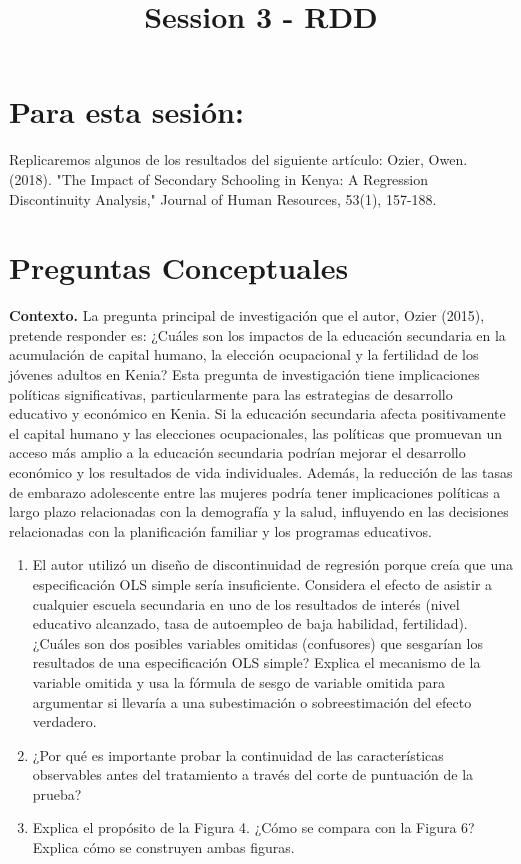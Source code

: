 \documentclass[11pt,a4paper,english]{article}
\title{Session 3 - RDD}
\author{}
\date{}
\begin{document}
\maketitle

\section*{Para esta sesión:} Replicaremos algunos de los resultados del
siguiente artículo: Ozier, Owen. (2018). "The Impact of Secondary Schooling in Kenya: A Regression Discontinuity Analysis," Journal of Human Resources, 53(1), 157-188.

\section*{Preguntas Conceptuales}

\textbf{Contexto.} La pregunta principal de investigación que el autor, Ozier (2015), pretende responder es: ¿Cuáles son los impactos de la educación secundaria en la acumulación de capital humano, la elección ocupacional y la fertilidad de los jóvenes adultos en Kenia? Esta pregunta de investigación tiene implicaciones políticas significativas, particularmente para las estrategias de desarrollo educativo y económico en Kenia. Si la educación secundaria afecta positivamente el capital humano y las elecciones ocupacionales, las políticas que promuevan un acceso más amplio a la educación secundaria podrían mejorar el desarrollo económico y los resultados de vida individuales. Además, la reducción de las tasas de embarazo adolescente entre las mujeres podría tener implicaciones políticas a largo plazo relacionadas con la demografía y la salud, influyendo en las decisiones relacionadas con la planificación familiar y los programas educativos.

\begin{enumerate}
    \item El autor utilizó un diseño de discontinuidad de regresión porque creía que una especificación OLS simple sería insuficiente. Considera el efecto de asistir a cualquier escuela secundaria en uno de los resultados de interés (nivel educativo alcanzado, tasa de autoempleo de baja habilidad, fertilidad). ¿Cuáles son dos posibles variables omitidas (confusores) que sesgarían los resultados de una especificación OLS simple? Explica el mecanismo de la variable omitida y usa la fórmula de sesgo de variable omitida para argumentar si llevaría a una subestimación o sobreestimación del efecto verdadero.
    \item ¿Por qué es importante probar la continuidad de las características observables antes del tratamiento a través del corte de puntuación de la prueba?
    \item Explica el propósito de la Figura 4. ¿Cómo se compara con la Figura 6? Explica cómo se construyen ambas figuras.
\end{enumerate}
\end{document}
